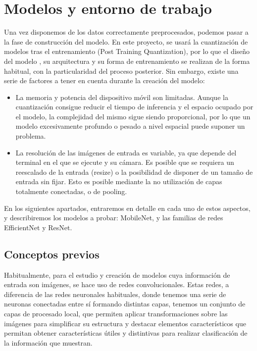 \chapter{Modelos y entorno de trabajo}

Una vez disponemos de los datos correctamente preprocesados, podemos pasar a la fase de construcción del modelo. En este proyecto, se usará la cuantización de modelos tras el entrenamiento (Post Training Quantization), por lo que el diseño del modelo , su arquitectura y su forma de entrenamiento se realizan de la forma habitual, con la particularidad del proceso posterior. Sin embargo, existe una serie de factores a tener en cuenta durante la creación del modelo:

\begin{itemize}
	\item La memoria y potencia del dispositivo móvil son limitadas. Aunque la cuantización consigue reducir el tiempo de inferencia y el espacio ocupado por el modelo, la complejidad del mismo sigue siendo proporcional, por lo que un modelo excesivamente profundo o pesado a nivel espacial puede suponer un problema.
	\item La resolución de las imágenes de entrada es variable, ya que depende del terminal en el que se ejecute y su cámara. Es posible que se requiera un reescalado de la entrada (resize) o la posibilidad de disponer de un tamaño de entrada sin fijar. Esto es posible mediante la no utilización de capas totalmente conectadas, o de pooling.
\end{itemize}

En los siguientes apartados, entraremos en detalle en cada uno de estos aspectos, y describiremos los modelos a probar: MobileNet, y las familias de redes EfficientNet y ResNet.

\section{Conceptos previos}

Habitualmente, para el estudio y creación de modelos cuya información de entrada son imágenes, se hace uso de redes convolucionales. Estas redes, a diferencia de las redes neuronales habituales, donde tenemos una serie de neuronas conectadas entre sí formando distintas capas,  tenemos un conjunto de capas de procesado local, que permiten aplicar transformaciones sobre las imágenes para simplificar su estructura y destacar elementos característicos que permitan obtener características útiles y distintivas para realizar clasificación de la información que muestran.

